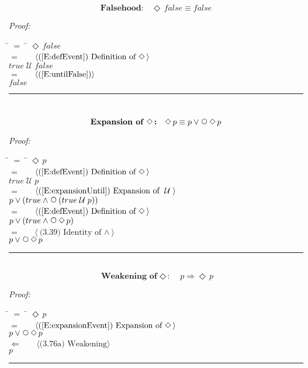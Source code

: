 \documentclass[fleqn, leqno]{article}
\newcommand{\lgap}{2pt}                             %
\newcommand{\mymathindent}{24pt}                    %
\newcommand{\Until}{\;\mathcal{U}\;}
\newcommand{\Next}{\;\,\text{\raisebox{3.5pt}{\circle{6}}}}
\newcommand{\Event}{\Diamond\,}
\newcommand{\myqed}{\hfill\rule[-.23ex]{1.2ex}{2.0ex}}
\newcommand{\Gll} {\langle}                         %
\newcommand{\Ggg} {\rangle}                         %
\newcommand{\Hint}[1]     {\ \ \ $\Gll              \mbox{#1} \Ggg$ }   %
\begin{document}
\begin{equation}\label{E:eventFalse}
\textbf{Falsehood:}\quad \Event false \equiv false
\end{equation}

\emph{Proof:}
\begin{tabbing}
\hspace{\mymathindent} \= $= \;$ \= \kill
  \> \>   $\Event false$\\[\lgap]
  \> $=$  \>  \Hint{(\ref{E:defEvent}) Definition of $\Event$}\\[\lgap]
  \> \>   $true \Until false$\\[\lgap]
  \> $=$  \>  \Hint{(\ref{E:untilFalse})}\\[\lgap]
  \> \>   $false$\\[\lgap]
\end{tabbing}
\myqed\\[\lgap]


\begin{equation}\label{E:expansionEvent}
\textbf{Expansion of $\Event$:}\quad \Event p \equiv p \lor \Next\Event p
\end{equation}

\emph{Proof:}
\begin{tabbing}
\hspace{\mymathindent} \= $= \;$ \= \kill
  \> \>   $\Event p$\\[\lgap]
  \> $=$  \>  \Hint{(\ref{E:defEvent}) Definition of $\Event$}\\[\lgap]
  \> \>   $true \Until p$\\[\lgap]
  \> $=$  \>  \Hint{(\ref{E:expansionUntil}) Expansion of $\Until$}\\[\lgap]
  \> \>   $p \lor (true \land \Next(true \Until p))$\\[\lgap]
  \> $=$  \>  \Hint{(\ref{E:defEvent}) Definition of $\Event$}\\[\lgap]
  \> \>   $p \lor (true \land \Next\Event p)$\\[\lgap]
  \> $=$  \>  \Hint{(3.39) Identity of $\land$}\\[\lgap]
  \> \>   $p \lor \Next\Event p$\\[\lgap]
\end{tabbing}
\myqed\\[\lgap]

\begin{equation}\label{E:impEvent}
\textbf{Weakening of $\Event$:}\quad p \Rightarrow \Event p
\end{equation}

\emph{Proof:}
\begin{tabbing}
\hspace{\mymathindent} \= $= \;$ \= \kill
  \> \>   $\Event p$\\[\lgap]
  \> $=$  \>  \Hint{(\ref{E:expansionEvent}) Expansion of $\Event$}\\[\lgap]
  \> \>   $p \lor \Next\Event p$\\[\lgap]
  \> $\Leftarrow$  \>  \Hint{(3.76a) Weakening}\\[\lgap]
  \> \>   $p$\\[\lgap]
\end{tabbing}
\myqed\\[\lgap]
\end{document}
